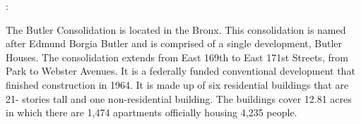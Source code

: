 :     

   

The Butler Consolidation is located in the Bronx. This consolidation is named after Edmund Borgia Butler and is comprised of a single development, Butler Houses. The consolidation extends from East 169th to East 171st Streets, from Park to Webster Avenues. It is a federally funded conventional development that finished construction in 1964. It is made up of six residential buildings that are 21- stories tall and one non-residential building. The buildings cover 12.81 acres in which there are 1,474 apartments officially housing 4,235 people. 